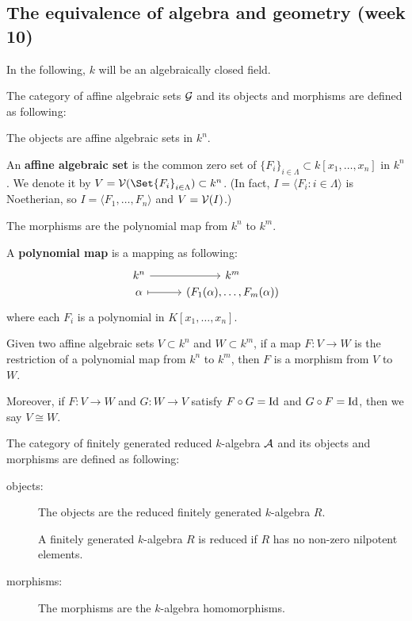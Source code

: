 \subsection{The equivalence of algebra and geometry (week 10)}

In the following, $k$ will be an algebraically closed field.
\begin{definition}
  The category of affine algebraic sets $\mathcal{G}$ and its objects and morphisms are defined as following:

  \begin{description}[leftmargin=0cm]
    \item[objects:] The objects are affine algebraic sets in $k^n$.

    An {\bf affine algebraic set} is the common zero set of $\{ F_i \}_{i \in \Lambda} \subset k[x_1, \dots, x_n]$
    in $k^n$.
    We denote it by $V = \Vc(\Set{F_i}_{i \in \Lambda}) \subset k^n$.
    (In fact, $I = \langle F_i : i \in \Lambda \rangle$ is Noetherian, so
    $I = \langle F_1, \dots, F_n \rangle$ and $V = \mathcal{V}(I)$.)

    \item[morphisms:] The morphisms are the polynomial map from $k^n$ to $k^m$.

      A {\bf polynomial map} is a mapping as following:
      \[
        \begin{tikzcd}[column sep=1cm,row sep=0ex]
            k^n \arrow[r]& k^m \\
           \alpha \arrow[r, mapsto] & (F_1(\alpha), \dots, F_m(\alpha))
        \end{tikzcd}
      \]
      where each $F_i$ is a polynomial in $K[x_1, \dots, x_n]$.

      Given two affine algebraic sets $V \subset k^n$ and $W \subset k^m$, if a map $F: V \to W$ is
      the restriction of a polynomial map from $k^n$ to $k^m$, then $F$ is a morphism from $V$ to $W$.

      Moreover, if $F: V \to W$ and $G : W \to V$ satisfy $F \circ G = {\rm Id}$ and $G \circ F = {\rm Id}$,
      then we say $V \cong W$.
  \end{description}
\end{definition}

\begin{definition}
  The category of finitely generated reduced $k$-algebra $\mathcal{A}$
  and its objects and morphisms are defined as following:

  \begin{description}
    \item[objects:] The objects are the reduced finitely generated $k$-algebra $R$.

    A finitely generated $k$-algebra $R$ is reduced if $R$ has no non-zero nilpotent elements.

    \item[morphisms:] The morphisms are the $k$-algebra homomorphisms.
  \end{description}
\end{definition}


